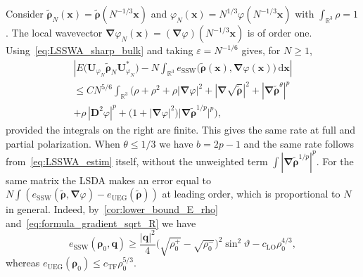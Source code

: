 \documentclass[final,reqno]{amsart}
\theoremstyle{remark}
\renewcommand{\le}{\leqslant}
\renewcommand{\ge}{\geqslant}
\renewcommand{\epsilon}{\varepsilon}
\newcommand{\wt}[1]{\widetilde{#1}}
\newcommand{\RR}{\mathbb{R}}
\newcommand{\TF}{\mathrm{TF}}
\newcommand{\LO}{\mathrm{LO}}
\newcommand{\UEG}{\mathrm{UEG}}
\newcommand{\SSW}{\mathrm{SSW}}
\newcommand{\grad}{\bm{\nabla}}
\newcommand{\dd}{\mathrm{d}}
\begin{document}
Consider $\wt{\bm{\rho}}_N(\mathbf{x})=\wt{\bm{\rho}}(N^{-1/3}\mathbf{x})$ and $\varphi_N(\mathbf{x})=N^{1/3}\varphi(N^{-1/3}\mathbf{x})$ with $\int_{\RR^3}\rho=1$. The local wavevector $\grad\varphi_N(\mathbf{x})=(\grad\varphi)(N^{-1/3}\mathbf{x})$ is of order one. Using~\cref{eq:LSSWA_sharp_bulk} and taking $\epsilon=N^{-1/6}$ gives, for $N\ge1$,
\begin{multline*}
\left|E\big(\mathbf{U}_{\varphi_N}\wt{\bm{\rho}}_N\mathbf{U}_{\varphi_N}^*\big)-N\int_{\RR^3}e_\SSW\big(\wt{\bm{\rho}}(\mathbf{x}),\grad\varphi(\mathbf{x})\big)\,\dd\mathbf{x}\right|\\
\le CN^{5/6}\int_{\RR^3}\Big(\rho+\rho^2+\rho|\grad\varphi|^2+|\grad\sqrt{\wt{\bm{\rho}}}|^2+|\grad\wt{\bm{\rho}}^\theta|^p\\
+\rho\,|\mathbf{D}^2\varphi|^p+\big(1+|\grad\varphi|^2\big)\big|\grad\wt{\bm{\rho}}^{1/p}\big|^p\Big),
\end{multline*}
provided the integrals on the right are finite. This gives the same rate at full and partial polarization. When $\theta\le1/3$ we have $b=2p-1$ and the same rate follows from~\cref{eq:LSSWA_estim} itself, without the unweighted term $\int|\grad\wt{\bm{\rho}}^{1/p}|^p$. For the same matrix the LSDA makes an error equal to $N\int(e_\SSW(\wt{\bm{\rho}},\grad\varphi)-e_\UEG(\wt{\bm{\rho}}))$ at leading order, which is proportional to $N$ in general. Indeed, by~\cref{cor:lower_bound_E_rho} and~\cref{eq:formula_gradient_sqrt_R} we have
$$
e_\SSW(\bm{\rho}_0,\mathbf{q})\ge\frac{|\mathbf{q}|^2}{4}\Big(\sqrt{\rho_0^+}-\sqrt{\rho_0^-}\Big)^2\sin^2\vartheta-c_\LO\rho_0^{4/3},
$$
whereas $e_\UEG(\bm{\rho}_0)\le c_\TF\rho_0^{5/3}$.
\end{document}
